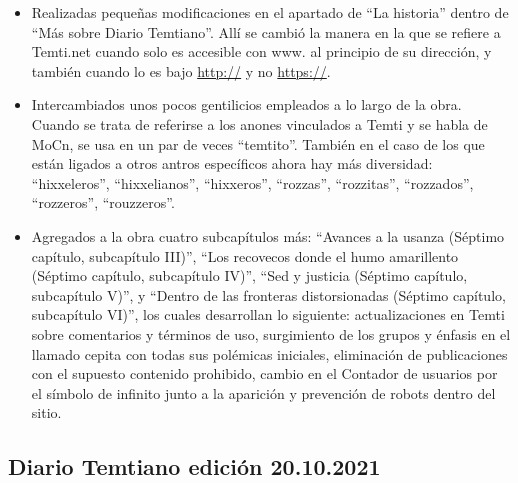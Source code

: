 \documentclass[
  spanish,
]{book}
\begin{document}
\begin{itemize}
\item
  Realizadas pequeñas modificaciones en el apartado de ``La historia'' dentro de ``Más sobre Diario Temtiano''. Allí se cambió la manera en la que se refiere a Temti.net cuando solo es accesible con www. al principio de su dirección, y también cuando lo es bajo \url{http://} y no \url{https://}.
\item
  Intercambiados unos pocos gentilicios empleados a lo largo de la obra. Cuando se trata de referirse a los anones vinculados a Temti y se habla de MoCn, se usa en un par de veces ``temtito''. También en el caso de los que están ligados a otros antros específicos ahora hay más diversidad: ``hixxeleros'', ``hixxelianos'', ``hixxeros'', ``rozzas'', ``rozzitas'', ``rozzados'', ``rozzeros'', ``rouzzeros''.
\item
  Agregados a la obra cuatro subcapítulos más: ``Avances a la usanza (Séptimo capítulo, subcapítulo III)'', ``Los recovecos donde el humo amarillento (Séptimo capítulo, subcapítulo IV)'', ``Sed y justicia (Séptimo capítulo, subcapítulo V)'', y ``Dentro de las fronteras distorsionadas (Séptimo capítulo, subcapítulo VI)'', los cuales desarrollan lo siguiente: actualizaciones en Temti sobre comentarios y términos de uso, surgimiento de los grupos y énfasis en el llamado cepita con todas sus polémicas iniciales, eliminación de publicaciones con el supuesto contenido prohibido, cambio en el Contador de usuarios por el símbolo de infinito junto a la aparición y prevención de robots dentro del sitio.
\end{itemize}

\hypertarget{diario-temtiano-ediciuxf3n-20.10.2021}{%
\subsection*{Diario Temtiano edición 20.10.2021}\label{diario-temtiano-ediciuxf3n-20.10.2021}}
\end{document}
